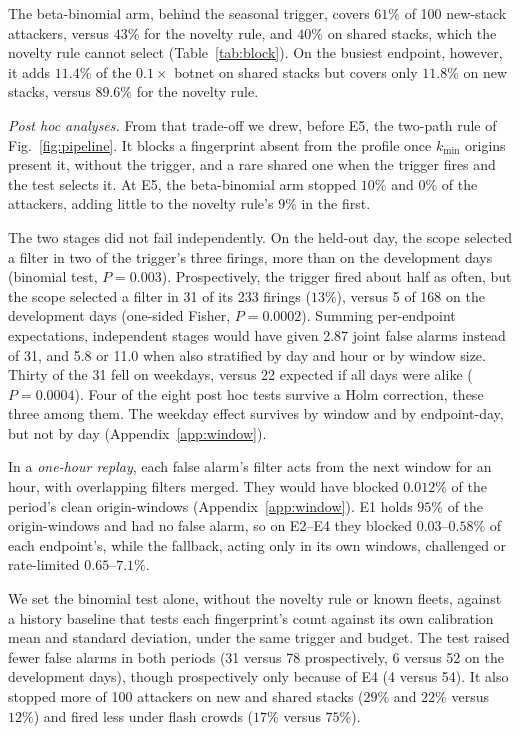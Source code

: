 \documentclass[conference,letterpaper,10pt]{IEEEtran}
\newcommand\1{\textit{(i)}}
\newcommand\2{\textit{(ii)}}
\newcommand\3{\textit{(iii)}}
\newcommand\4{\textit{(iv)}}
\newcommand\5{\textit{(v)}}
\newcommand\6{\textit{(vi)}}
\newcommand\7{\textit{(vii)}}
\newcommand\8{\textit{(viii)}}
\newcommand\9{\textit{(ix)}}
\begin{document}
The beta-binomial arm, behind the seasonal trigger, covers $61\%$ of 100 new-stack attackers, versus $43\%$ for the novelty rule, and $40\%$ on shared stacks, which the novelty rule cannot select (Table~\ref{tab:block}). On the busiest endpoint, however, it adds $11.4\%$ of the $0.1\times$ botnet on shared stacks but covers only $11.8\%$ on new stacks, versus $89.6\%$ for the novelty rule.

\textit{Post hoc analyses.} From that trade-off we drew, before E5, the two-path rule of Fig.~\ref{fig:pipeline}. It blocks a fingerprint absent from the profile once $k_{\min}$ origins present it, without the trigger, and a rare shared one when the trigger fires and the test selects it. At E5, the beta-binomial arm stopped $10\%$ and $0\%$ of the attackers, adding little to the novelty rule's $9\%$ in the first.

The two stages did not fail independently. On the held-out day, the scope selected a filter in two of the trigger's three firings, more than on the development days (binomial test, $P = 0.003$). Prospectively, the trigger fired about half as often, but the scope selected a filter in 31 of its 233 firings ($13\%$), versus 5 of 168 on the development days (one-sided Fisher, $P = 0.0002$). Summing per-endpoint expectations, independent stages would have given 2.87 joint false alarms instead of 31, and 5.8 or 11.0 when also stratified by day and hour or by window size. Thirty of the 31 fell on weekdays, versus 22 expected if all days were alike ($P = 0.0004$). Four of the eight post hoc tests survive a Holm correction, these three among them. The weekday effect survives by window and by endpoint-day, but not by day (Appendix~\ref{app:window}).

In a \textit{one-hour replay}, each false alarm's filter acts from the next window for an hour, with overlapping filters merged. They would have blocked $0.012\%$ of the period's clean origin-windows (Appendix~\ref{app:window}). E1 holds $95\%$ of the origin-windows and had no false alarm, so on E2--E4 they blocked $0.03$--$0.58\%$ of each endpoint's, while the fallback, acting only in its own windows, challenged or rate-limited $0.65$--$7.1\%$.

We set the binomial test alone, without the novelty rule or known fleets, against a history baseline that tests each fingerprint's count against its own calibration mean and standard deviation, under the same trigger and budget. The test raised fewer false alarms in both periods (31 versus 78 prospectively, 6 versus 52 on the development days), though prospectively only because of E4 (4 versus 54). It also stopped more of 100 attackers on new and shared stacks ($29\%$ and $22\%$ versus $12\%$) and fired less under flash crowds ($17\%$ versus $75\%$).
\end{document}

